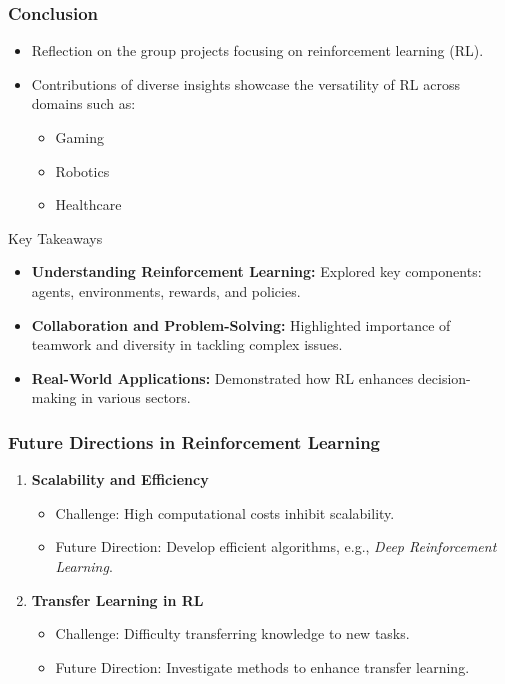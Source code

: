 \documentclass{beamer}
\begin{document}
\begin{frame}[fragile]
    \frametitle{Conclusion}
    \begin{itemize}
        \item Reflection on the group projects focusing on reinforcement learning (RL).
        \item Contributions of diverse insights showcase the versatility of RL across domains such as:
        \begin{itemize}
            \item Gaming
            \item Robotics
            \item Healthcare
        \end{itemize}
    \end{itemize}
    
    \begin{block}{Key Takeaways}
        \begin{itemize}
            \item \textbf{Understanding Reinforcement Learning:} Explored key components: agents, environments, rewards, and policies.
            \item \textbf{Collaboration and Problem-Solving:} Highlighted importance of teamwork and diversity in tackling complex issues.
            \item \textbf{Real-World Applications:} Demonstrated how RL enhances decision-making in various sectors.
        \end{itemize}
    \end{block}
\end{frame}

\begin{frame}[fragile]
    \frametitle{Future Directions in Reinforcement Learning}
    \begin{enumerate}
        \item \textbf{Scalability and Efficiency}
            \begin{itemize}
                \item Challenge: High computational costs inhibit scalability.
                \item Future Direction: Develop efficient algorithms, e.g., \textit{Deep Reinforcement Learning}.
            \end{itemize}
        
        \item \textbf{Transfer Learning in RL}
            \begin{itemize}
                \item Challenge: Difficulty transferring knowledge to new tasks.
                \item Future Direction: Investigate methods to enhance transfer learning.
            \end{itemize}
    \end{enumerate}
\end{frame}
\end{document}

